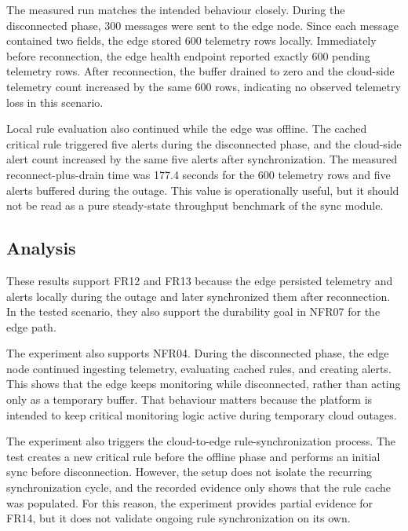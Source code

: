 The measured run matches the intended behaviour closely. During the disconnected phase, 300 messages were sent to the edge node. Since each message contained two fields, the edge stored 600 telemetry rows locally. Immediately before reconnection, the edge health endpoint reported exactly 600 pending telemetry rows. After reconnection, the buffer drained to zero and the cloud-side telemetry count increased by the same 600 rows, indicating no observed telemetry loss in this scenario.

Local rule evaluation also continued while the edge was offline. The cached critical rule triggered five alerts during the disconnected phase, and the cloud-side alert count increased by the same five alerts after synchronization. The measured reconnect-plus-drain time was 177.4 seconds for the 600 telemetry rows and five alerts buffered during the outage. This value is operationally useful, but it should not be read as a pure steady-state throughput benchmark of the sync module.

\subsection{Analysis}
\label{subsec:EvalOfflineAnalysis}

These results support FR12 and FR13 because the edge persisted telemetry and alerts locally during the outage and later synchronized them after reconnection. In the tested scenario, they also support the durability goal in NFR07 for the edge path.

The experiment also supports NFR04. During the disconnected phase, the edge node continued ingesting telemetry, evaluating cached rules, and creating alerts. This shows that the edge keeps monitoring while disconnected, rather than acting only as a temporary buffer. That behaviour matters because the platform is intended to keep critical monitoring logic active during temporary cloud outages.

The experiment also triggers the cloud-to-edge rule-synchronization process. The test creates a new critical rule before the offline phase and performs an initial sync before disconnection. However, the setup does not isolate the recurring synchronization cycle, and the recorded evidence only shows that the rule cache was populated. For this reason, the experiment provides partial evidence for FR14, but it does not validate ongoing rule synchronization on its own.

